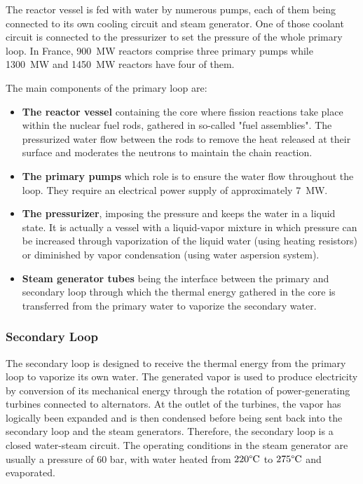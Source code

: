 \npar

The reactor vessel is fed with water by numerous pumps, each of them being connected to its own cooling circuit and steam generator. One of those coolant circuit is connected to the pressurizer to set the pressure of the whole primary loop. In France, 900~MW reactors comprise three primary pumps while 1300~MW and 1450~MW reactors have four of them.

\npar

The main components of the primary loop are:

\begin{itemize}
\item \textbf{The reactor vessel} containing the core where fission reactions take place within the nuclear fuel rods, gathered in so-called "fuel assemblies". The pressurized water flow between the rods to remove the heat released at their surface and moderates the neutrons to maintain the chain reaction.

\item \textbf{The primary pumps} which role is to ensure the water flow throughout the loop. They require an electrical power supply of approximately 7~MW.

\item \textbf{The pressurizer}, imposing the pressure and keeps the water in a liquid state. It is actually a vessel with a liquid-vapor mixture in which pressure can be increased through vaporization of the liquid water (using heating resistors) or diminished by vapor condensation (using water aspersion system).

\item \textbf{Steam generator tubes} being the interface between the primary and secondary loop through which the thermal energy gathered in the core is transferred from the primary water to vaporize the secondary water.
\end{itemize}


\subsubsection{Secondary Loop}

The secondary loop is designed to receive the thermal energy from the primary loop to vaporize its own water. The generated vapor is used to produce electricity by conversion of its mechanical energy through the rotation of power-generating turbines connected to alternators. At the outlet of the turbines, the vapor has logically been expanded and is then condensed before being sent back into the secondary loop and the steam generators. Therefore, the secondary loop is a closed water-steam circuit. The operating conditions in the steam generator are usually a pressure of 60 bar, with water heated from $220\degree\mathrm{C}$ to $275\degree\mathrm{C}$ and evaporated.

